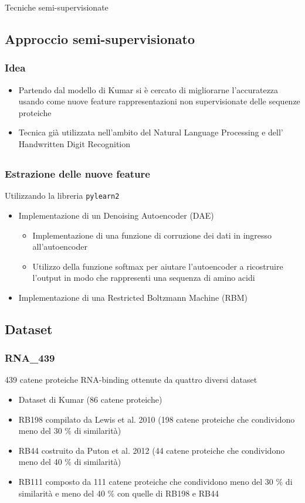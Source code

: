 \documentclass{beamer}
\begin{document}
\begin{section}{Tecniche semi-supervisionate}
\subsection{Approccio semi-supervisionato}
\begin{frame}
\frametitle{Idea}
\begin{itemize}
\item Partendo dal modello di Kumar si \`{e} cercato di migliorarne l'accuratezza usando come nuove feature rappresentazioni non supervisionate delle sequenze proteiche
\item Tecnica gi\`{a} utilizzata nell'ambito del Natural Language Processing e dell' Handwritten Digit Recognition
\end{itemize}
\end{frame}

\subsection{}
\begin{frame}
\frametitle{Estrazione delle nuove feature}
Utilizzando la libreria \texttt{pylearn2}
\begin{itemize}
\item Implementazione di un Denoising Autoencoder (DAE)
\begin{itemize}
\item Implementazione di una funzione di corruzione dei dati in ingresso all'autoencoder
\item Utilizzo della funzione softmax per aiutare l'autoencoder a ricostruire l'output in modo che rappresenti una sequenza di amino acidi
\end{itemize}
\item Implementazione di una Restricted Boltzmann Machine (RBM)
\end{itemize}
\end{frame}

\subsection{Dataset}
\begin{frame}
\frametitle{RNA\_439}
439 catene proteiche RNA-binding ottenute da quattro diversi dataset
\begin{itemize}
\item Dataset di Kumar (86 catene proteiche)
\item RB198 compilato da Lewis et al. 2010 (198 catene proteiche che condividono meno del 30 \% di similarit\`{a})
\item RB44 costruito da Puton et al. 2012 (44 catene proteiche che condividono meno del 40 \% di similarit\`{a})
\item RB111 composto da 111 catene proteiche che condividono meno del 30 \% di similarit\`{a} e meno del 40 \% con quelle di RB198 e RB44
\end{itemize}
\end{frame}


\end{section}
\end{document}
